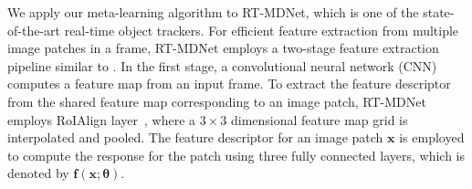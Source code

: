 \documentclass[letterpaper]{article} %
\def \x{\mathbf{x}}
\def \f{\mathbf{f}}
\begin{document}
We apply our meta-learning algorithm to RT-MDNet, which is one of the state-of-the-art real-time object trackers.
For efficient feature extraction from multiple image patches in a frame, RT-MDNet employs a two-stage feature extraction pipeline similar to \cite{he2017maskrcnn}.
In the first stage, a convolutional neural network (CNN) computes a feature map from an input frame.
To extract the feature descriptor from the shared feature map corresponding to an image patch, RT-MDNet employs RoIAlign layer~\cite{he2017maskrcnn}, where a $3 \times 3$ dimensional feature map grid is interpolated and pooled.
The feature descriptor for an image patch $\x$ is employed to compute the response for the patch using three fully connected layers, which is denoted by $\f(\x; \boldsymbol{\theta})$.
\end{document}
